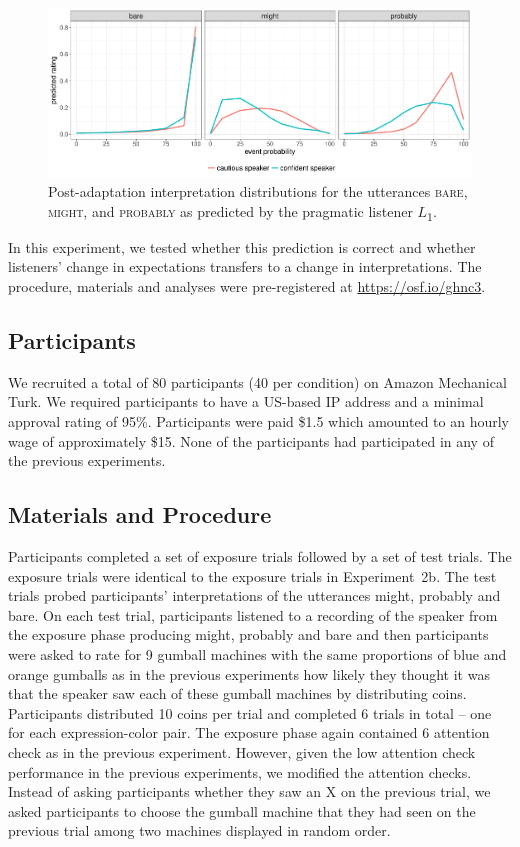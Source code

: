 \documentclass[man, floatsintext]{apa6}
\begin{document}
\begin{figure}
  \includegraphics[width=\textwidth]{plots/adaptation-posterior-comp.pdf}
  \caption{Post-adaptation interpretation distributions for the utterances  \textsc{bare}, \textsc{might}, and \textsc{probably} as predicted by the pragmatic listener $L$\textsubscript{$1$}. \label{fig:post-exposure-comp}}
\end{figure}

In this experiment, we tested whether this prediction is correct and whether listeners' change in expectations transfers to a change in interpretations. 
The procedure, materials and analyses were pre-registered at \url{https://osf.io/ghnc3}.

\subsection{Participants}

We recruited a total of 80 participants (40 per condition) on Amazon Mechanical Turk. We required participants to have a US-based IP address and a minimal approval rating of 95\%. Participants were paid \$1.5 which amounted to an hourly wage of approximately \$15. None of the participants had participated in any of the previous experiments. 

\subsection{Materials and Procedure}

Participants completed a set of exposure trials followed by a set of test trials. The exposure trials were identical to the exposure trials in Experiment~2b. The test trials probed participants' interpretations of the utterances {\sc might}, {\sc probably} and {\sc bare}. On each test trial, participants listened to a recording of the speaker from the exposure phase producing {\sc might}, {\sc probably} and {\sc bare} and then participants were asked to rate for 9 gumball machines with the same proportions of blue and orange gumballs as in the previous experiments how likely they thought it was that the speaker saw each of these gumball machines by distributing coins.  Participants distributed 10 coins per trial and completed 6 trials in total  -- one for each expression-color pair. The exposure phase again contained  6 attention check as in the previous experiment. However, given the low attention check performance in the previous experiments, we modified the attention checks. Instead of asking participants whether they saw an X on the previous trial, we asked participants to choose the gumball machine that they had seen on the previous trial among two machines displayed in random order.
\end{document}
